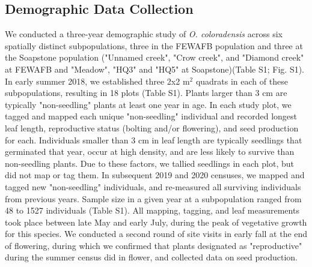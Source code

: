 \documentclass[12pt, letterpaper]{article}
\begin{document}
\subsection{Demographic Data Collection}
 We conducted a three-year demographic study of \textit{O. coloradensis} across six spatially distinct subpopulations, three in the FEWAFB population and three at the Soapstone population ("Unnamed creek", "Crow creek", and "Diamond creek" at FEWAFB and "Meadow", "HQ3" and "HQ5" at Soapstone)(Table S1; Fig. S1). In early summer 2018, we established three 2\textsf{x}2 m$^2$ quadrats in each of these subpopulations, resulting in 18 plots (Table S1). Plants larger than 3 cm are typically "non-seedling" plants at least one year in age. In each study plot, we tagged and mapped each unique "non-seedling" individual and recorded longest leaf length, reproductive status (bolting and/or flowering), and seed production for each. Individuals smaller than 3 cm in leaf length are typically seedlings that germinated that year, occur at high density, and are less likely to survive than non-seedling plants. Due to these factors, we tallied seedlings in each plot, but did not map or tag them. In subsequent 2019 and 2020 censuses, we mapped and tagged new "non-seedling" individuals, and re-measured all surviving individuals from previous years. Sample size in a given year at a subpopulation ranged from 48 to 1527 individuals (Table S1). All mapping, tagging, and leaf measurements took place between late May and early July, during the peak of vegetative growth for this species. We conducted a second round of site visits in early fall at the end of flowering, during which we confirmed that plants  designated as "reproductive" during the summer census did in flower, and collected data on seed production. 
 
\end{document}
